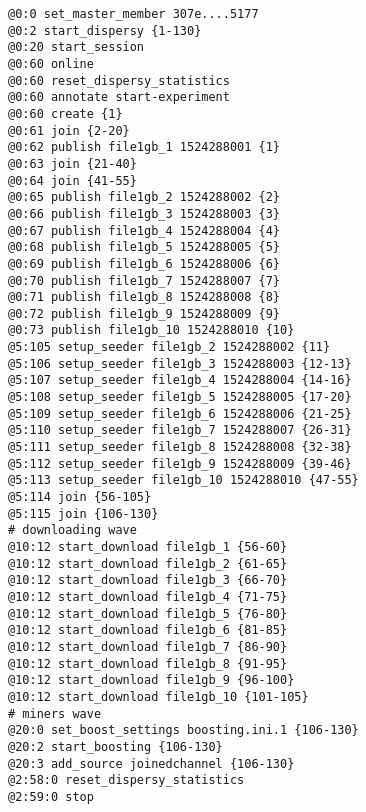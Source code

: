 \begin{appendices}
\begin{lstlisting}[caption={Scenario 2.}]
@0:0 set_master_member 307e....5177
@0:2 start_dispersy {1-130}
@0:20 start_session
@0:60 online
@0:60 reset_dispersy_statistics
@0:60 annotate start-experiment
@0:60 create {1}
@0:61 join {2-20}
@0:62 publish file1gb_1 1524288001 {1}
@0:63 join {21-40}
@0:64 join {41-55}
@0:65 publish file1gb_2 1524288002 {2}
@0:66 publish file1gb_3 1524288003 {3}
@0:67 publish file1gb_4 1524288004 {4}
@0:68 publish file1gb_5 1524288005 {5}
@0:69 publish file1gb_6 1524288006 {6}
@0:70 publish file1gb_7 1524288007 {7}
@0:71 publish file1gb_8 1524288008 {8}
@0:72 publish file1gb_9 1524288009 {9}
@0:73 publish file1gb_10 1524288010 {10}
@5:105 setup_seeder file1gb_2 1524288002 {11}
@5:106 setup_seeder file1gb_3 1524288003 {12-13}
@5:107 setup_seeder file1gb_4 1524288004 {14-16}
@5:108 setup_seeder file1gb_5 1524288005 {17-20}
@5:109 setup_seeder file1gb_6 1524288006 {21-25}
@5:110 setup_seeder file1gb_7 1524288007 {26-31}
@5:111 setup_seeder file1gb_8 1524288008 {32-38}
@5:112 setup_seeder file1gb_9 1524288009 {39-46}
@5:113 setup_seeder file1gb_10 1524288010 {47-55}
@5:114 join {56-105}
@5:115 join {106-130}
# downloading wave
@10:12 start_download file1gb_1 {56-60}
@10:12 start_download file1gb_2 {61-65}
@10:12 start_download file1gb_3 {66-70}
@10:12 start_download file1gb_4 {71-75}
@10:12 start_download file1gb_5 {76-80}
@10:12 start_download file1gb_6 {81-85}
@10:12 start_download file1gb_7 {86-90}
@10:12 start_download file1gb_8 {91-95}
@10:12 start_download file1gb_9 {96-100}
@10:12 start_download file1gb_10 {101-105}
# miners wave
@20:0 set_boost_settings boosting.ini.1 {106-130}
@20:2 start_boosting {106-130}
@20:3 add_source joinedchannel {106-130}
@2:58:0 reset_dispersy_statistics
@2:59:0 stop
\end{lstlisting}


\end{appendices}
